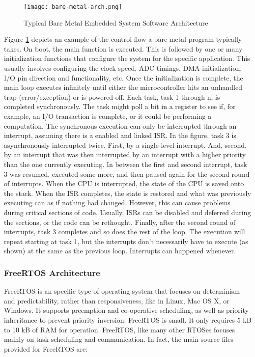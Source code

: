\begin{figure}
\centering
\texttt{[image: bare-metal-arch.png]}
\caption{Typical Bare Metal Embedded System Software Architecture}
\label{fig:bare-metal-arch}
\end{figure}

Figure \ref{fig:bare-metal-arch} depicts an example of the control flow a bare
metal program typically takes. On boot, the main function is executed. This is
followed by one or many initialization functions that configure the system for
the specific application. This usually involves configuring the clock speed, ADC
timings, DMA initialization, I/O pin direction and functionality, etc. Once the
initialization is complete, the main loop executes infinitely until either the
microcontroller hits an unhandled trap (error/exception) or is powered off. Each
task, task 1 through n, is completed synchronously. The task might poll a bit in
a register to see if, for example, an I/O transaction is complete, or it could
be performing a computation. The synchronous execution can only be interrupted
through an interrupt, assuming there is a enabled and linked ISR. In the figure,
task 3 is asynchronously interrupted twice. First, by a single-level interrupt.
And, second, by an interrupt that was then interrupted by an interrupt with a
higher priority than the one currently executing. In between the first and
second interrupt, task 3 was resumed, executed some more, and then paused again
for the second round of interrupts. When the CPU is interrupted, the state of
the CPU is saved onto the stack. When the ISR completes, the state is restored
and what was previously executing can as if nothing had changed.  However, this
can cause problems during critical sections of code. Usually, ISRs can be
disabled and deferred during the sections, or the code can be rethought.
Finally, after the second round of interrupts, task 3 completes and so does the
rest of the loop. The execution will repeat starting at task 1, but the
interrupts don't necessarily have to execute (as shown) at the same as the
previous loop. Interrupts can happened whenever.


\subsubsection{FreeRTOS Architecture} \label{sec-freertos}
FreeRTOS is an specific type of operating system that focuses on determinism and
predictability, rather than responsiveness, like in Linux, Mac OS X, or Windows.
It supports preemption and co-operative scheduling, as well as priority
inheritance to prevent priority inversion. FreeRTOS is small. It only requires 5 kB 
to 10 kB of RAM for operation. FreeRTOS, like many other RTOSes focuses mainly
on task scheduling and communication. In fact, the main source files provided
for FreeRTOS are:

